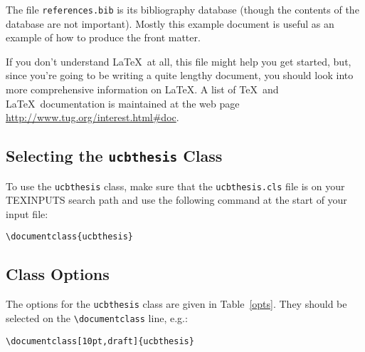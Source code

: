 \documentclass[11pt]{article}
\newcommand*{\pkg}[1]{\texttt{#1}}
\begin{document}
The file \texttt{references.bib} is its bibliography database (though
the contents of the database are not important).  Mostly this example
document is useful as an example of how to produce the front matter.

If you don't understand \LaTeX\ at all, this file might help you get
started, but, since you're going to be writing a quite lengthy document,
you should look into more comprehensive information on \LaTeX.
A list of \TeX\ and \LaTeX\ documentation is maintained at the web page
\url{http://www.tug.org/interest.html#doc}.

\subsection{Selecting the \pkg{ucbthesis} Class}

To use the \pkg{ucbthesis} class, make sure that the \texttt{ucbthesis.cls}
file is on your TEXINPUTS search path and use the following command at
the start of your input file:

\begin{lstlisting}
\documentclass{ucbthesis}
\end{lstlisting}

\subsection{Class Options}

The options for the \pkg{ucbthesis} class are given in Table~\ref{opts}.
They should be selected on the \verb|\documentclass| line, e.g.:
\begin{lstlisting}
\documentclass[10pt,draft]{ucbthesis}
\end{lstlisting}
\end{document}

